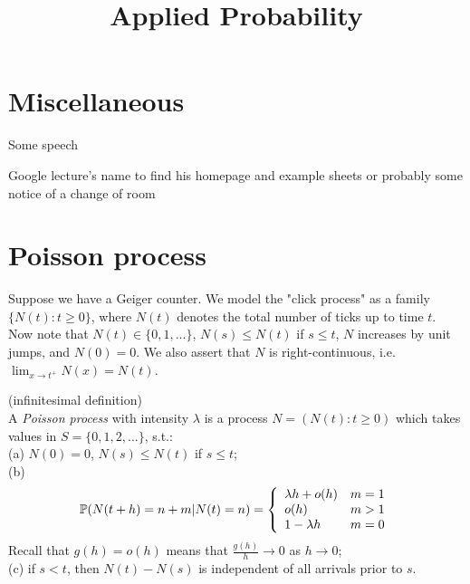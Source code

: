 \documentclass[a4paper]{article}
\begin{document}
\title{Applied Probability}

\maketitle

\newpage

\tableofcontents

\newpage

\section{Miscellaneous}

Some speech

Google lecture's name to find his homepage and example sheets or probably some notice of a change of room

\newpage

\section{Poisson process}

Suppose we have a Geiger counter. We model the "click process" as a family $\{N(t) : t \geq 0\}$, where $N(t)$ denotes the total number of ticks up to time $t$. Now note that $N(t) \in \{0,1,...\}$, $N(s) \leq N(t)$ if $s \leq t$, $N$ increases by unit jumps, and $N(0) = 0$. We also assert that $N$ is right-continuous, i.e. $\lim_{x \to t^+} N(x) = N(t)$.

\begin{defi} (infinitesimal definition)\\
A \emph{Poisson process} with intensity $\lambda$ is a process $N=(N(t):t \geq 0)$ which takes values in $S = \{0,1,2,...\}$, s.t.:\\
(a) $N(0) = 0$, $N(s) \leq N(t)$ if $s \leq t$;\\
(b) 
\begin{equation*}
\begin{aligned}
\P(N(t+h)=n+m | N(t) = n) = \left\{\begin{array}{ll}
\lambda h + o(h) & m=1\\
o(h) & m>1\\
1-\lambda h & m=0
\end{array}
\right.
\end{aligned}
\end{equation*}
Recall that $g(h) = o(h)$ means that $\frac{g(h)}{h} \to 0$ as $h \to 0$;\\
(c) if $s<t$, then $N(t)-N(s)$ is independent of all arrivals prior to $s$.
\end{defi}
\end{document}
